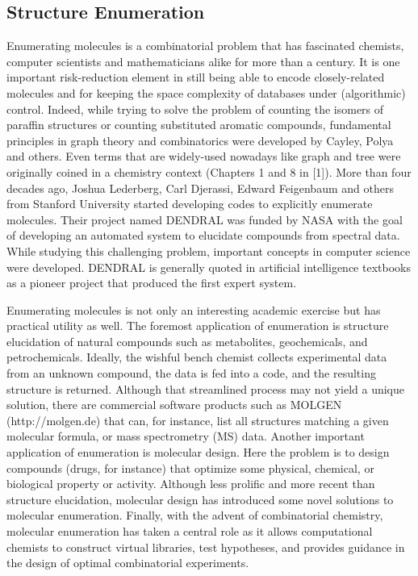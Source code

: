 \documentclass{sig-alternate}
\begin{document}
\subsection{Structure Enumeration}
\label{sec:struct-enum}

Enumerating molecules is a combinatorial problem that has fascinated chemists,
computer scientists and mathematicians alike for more than a century. It is one
important risk-reduction element in still being able to encode closely-related
molecules and for keeping the space complexity of databases under (algorithmic)
control. Indeed, while trying to solve the problem of counting the isomers of
paraffin structures or counting substituted aromatic compounds, fundamental
principles in graph theory and combinatorics were developed by Cayley, Polya and
others. Even terms that are widely-used nowadays like graph and tree were
originally coined in a chemistry context (Chapters 1 and 8 in [1]). More than
four decades ago, Joshua Lederberg, Carl Djerassi, Edward Feigenbaum and others
from Stanford University started developing codes to explicitly enumerate
molecules. Their project named DENDRAL was funded by NASA with the goal of
developing an automated system to elucidate compounds from spectral data. While
studying this challenging problem, important concepts in computer science were
developed. DENDRAL is generally quoted in artificial intelligence textbooks as a
pioneer project that produced the first expert system.
 
Enumerating molecules is not only an interesting academic exercise but has
practical utility as well. The foremost application of enumeration is structure
elucidation of natural compounds such as metabolites, geochemicals, and
petrochemicals. Ideally, the wishful bench chemist collects experimental data
from an unknown compound, the data is fed into a code, and the resulting
structure is returned. Although that streamlined process may not yield a unique
solution, there are commercial software products such as MOLGEN
(http://molgen.de) that can, for instance, list all structures matching a given
molecular formula, or mass spectrometry (MS) data. Another important application
of enumeration is molecular design. Here the problem is to design compounds
(drugs, for instance) that optimize some physical, chemical, or biological
property or activity. Although less prolific and more recent than structure
elucidation, molecular design has introduced some novel solutions to molecular
enumeration. Finally, with the advent of combinatorial chemistry, molecular
enumeration has taken a central role as it allows computational chemists to
construct virtual libraries, test hypotheses, and provides guidance in the
design of optimal combinatorial experiments.
 
\end{document}
